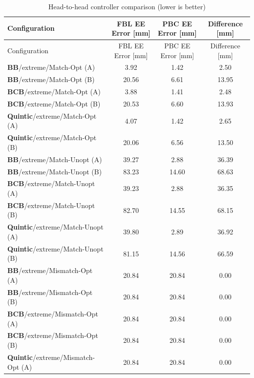 \documentclass[11pt,a4paper]{article}
\begin{document}
\begin{longtable}{p{5cm}ccc}
\caption{Head-to-head controller comparison (lower is better)} \\
\toprule
Configuration & FBL EE Error [mm] & PBC EE Error [mm] & Difference [mm] \\
\midrule
\endfirsthead
\toprule
Configuration & FBL EE Error [mm] & PBC EE Error [mm] & Difference [mm] \\
\midrule
\endhead
\textbf{BB}/extreme/Match-Opt (A) & 3.92 & \textcolor{bestcolor}{1.42} & 2.50 \\
\textbf{BB}/extreme/Match-Opt (B) & 20.56 & \textcolor{bestcolor}{6.61} & 13.95 \\
\midrule
\textbf{BCB}/extreme/Match-Opt (A) & 3.88 & \textcolor{bestcolor}{1.41} & 2.48 \\
\textbf{BCB}/extreme/Match-Opt (B) & 20.53 & \textcolor{bestcolor}{6.60} & 13.93 \\
\midrule
\textbf{Quintic}/extreme/Match-Opt (A) & 4.07 & \textcolor{bestcolor}{1.42} & 2.65 \\
\textbf{Quintic}/extreme/Match-Opt (B) & 20.06 & \textcolor{bestcolor}{6.56} & 13.50 \\
\midrule
\textbf{BB}/extreme/Match-Unopt (A) & 39.27 & \textcolor{bestcolor}{2.88} & 36.39 \\
\textbf{BB}/extreme/Match-Unopt (B) & 83.23 & \textcolor{bestcolor}{14.60} & 68.63 \\
\midrule
\textbf{BCB}/extreme/Match-Unopt (A) & 39.23 & \textcolor{bestcolor}{2.88} & 36.35 \\
\textbf{BCB}/extreme/Match-Unopt (B) & 82.70 & \textcolor{bestcolor}{14.55} & 68.15 \\
\midrule
\textbf{Quintic}/extreme/Match-Unopt (A) & 39.80 & \textcolor{bestcolor}{2.89} & 36.92 \\
\textbf{Quintic}/extreme/Match-Unopt (B) & 81.15 & \textcolor{bestcolor}{14.56} & 66.59 \\
\midrule
\textbf{BB}/extreme/Mismatch-Opt (A) & \textcolor{bestcolor}{20.84} & 20.84 & 0.00 \\
\textbf{BB}/extreme/Mismatch-Opt (B) & \textcolor{bestcolor}{20.84} & 20.84 & 0.00 \\
\midrule
\textbf{BCB}/extreme/Mismatch-Opt (A) & \textcolor{bestcolor}{20.84} & 20.84 & 0.00 \\
\textbf{BCB}/extreme/Mismatch-Opt (B) & \textcolor{bestcolor}{20.84} & 20.84 & 0.00 \\
\midrule
\textbf{Quintic}/extreme/Mismatch-Opt (A) & \textcolor{bestcolor}{20.84} & 20.84 & 0.00 \\

\end{longtable}
\end{document}
